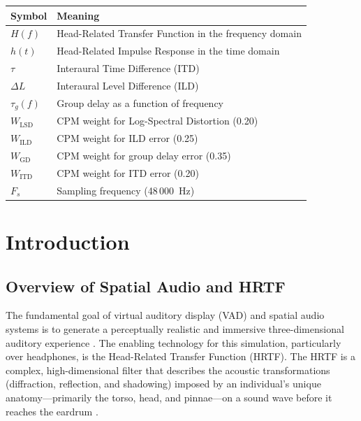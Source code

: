 \documentclass[12pt,a4paper]{article}
\begin{document}
\begin{table}[h!]
\centering
\begin{tabular}{|l|l|}
\hline
\textbf{Symbol} & \textbf{Meaning} \\
\hline
$H(f)$ & Head-Related Transfer Function in the frequency domain \\
\hline
$h(t)$ & Head-Related Impulse Response in the time domain \\
\hline
$\tau$ & Interaural Time Difference (ITD) \\
\hline
$\Delta L$ & Interaural Level Difference (ILD) \\
\hline
$\tau_g(f)$ & Group delay as a function of frequency \\
\hline
$W_{\mathrm{LSD}}$ & CPM weight for Log-Spectral Distortion (0.20) \\
\hline
$W_{\mathrm{ILD}}$ & CPM weight for ILD error (0.25) \\
\hline
$W_{\mathrm{GD}}$ & CPM weight for group delay error (0.35) \\
\hline
$W_{\mathrm{ITD}}$ & CPM weight for ITD error (0.20) \\
\hline
$F_s$ & Sampling frequency (48\,000~Hz) \\
\hline
\end{tabular}
\end{table}

\newpage
{}


\section{Introduction}

\subsection{Overview of Spatial Audio and HRTF}

The fundamental goal of virtual auditory display (VAD) and spatial audio systems is to generate a perceptually realistic and immersive three-dimensional auditory experience \cite{asaudio2025}. The enabling technology for this simulation, particularly over headphones, is the Head-Related Transfer Function (HRTF). The HRTF is a complex, high-dimensional filter that describes the acoustic transformations (diffraction, reflection, and shadowing) imposed by an individual's unique anatomy---primarily the torso, head, and pinnae---on a sound wave before it reaches the eardrum \cite{asaudio2025}.
\end{document}
